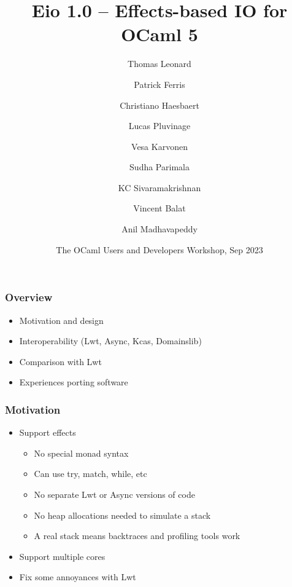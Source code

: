 \documentclass{beamer}
\title[Eio]{Eio 1.0 – Effects-based IO for OCaml 5}
\author[Thomas Leonard]
{Thomas Leonard\and Patrick Ferris\and Christiano Haesbaert\and Lucas Pluvinage\and Vesa Karvonen\and Sudha Parimala\and KC Sivaramakrishnan\and Vincent Balat\and Anil Madhavapeddy}
\institute{Tarides}
\date[OCaml 2023]{The OCaml Users and Developers Workshop, Sep 2023}
\newcommand\mlkeyword[1]{{\ttfamily\color{darkblue} #1}}
\begin{document}

\frame{\titlepage}

\begin{frame}
	\frametitle{Overview}
	\begin{itemize}
		\item Motivation and design
		\item Interoperability (Lwt, Async, Kcas, Domainslib)
		\item Comparison with Lwt
		\item Experiences porting software
	\end{itemize}
\end{frame}

\begin{frame}[fragile]
	\frametitle{Motivation}
	\begin{itemize}
		\item Support effects
		\begin{itemize}
			\item No special monad syntax
			\item Can use \mlkeyword{try}, \mlkeyword{match}, \mlkeyword{while}, etc
			\item No separate Lwt or Async versions of code
			\item No heap allocations needed to simulate a stack
			\item A real stack means backtraces and profiling tools work
		\end{itemize}
		\item Support multiple cores
		\item Fix some annoyances with Lwt
	\end{itemize}
\end{frame}
\end{document}

